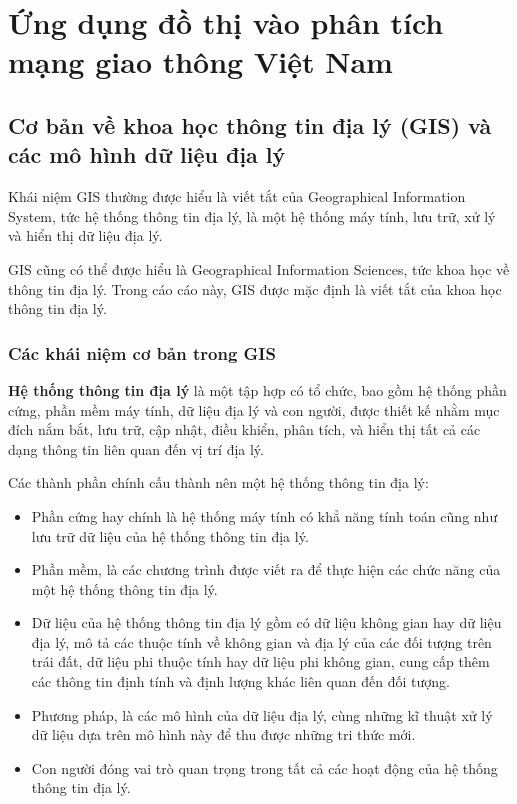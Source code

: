 \documentclass[14pt, oneside, a4paper, openany]{scrartcl}
\begin{document}
\section{Ứng dụng đồ thị vào phân tích mạng giao thông Việt Nam}
\subsection{Cơ bản về khoa học thông tin địa lý (GIS) và các mô hình dữ liệu địa lý}

Khái niệm GIS thường được hiểu là viết tắt của Geographical Information System, tức hệ thống thông tin địa lý, là một hệ thống máy tính, lưu trữ, xử lý và hiển thị dữ liệu địa lý.

GIS cũng có thể được hiểu là Geographical Information Sciences, tức khoa học về thông tin địa lý. Trong cáo cáo này, GIS được mặc định là viết tắt của khoa học thông tin địa lý.

\subsubsection{Các khái niệm cơ bản trong GIS}
\textbf{Hệ thống thông tin địa lý}  là một tập hợp có tổ chức, bao gồm hệ thống phần cứng, phần mềm máy tính, dữ liệu địa lý và con người, được thiết kế nhằm mục đích nắm bắt, lưu trữ, cập nhật, điều khiển, phân tích, và hiển thị tất cả các dạng thông tin liên quan đến vị trí địa lý.

Các thành phần chính cấu thành nên một hệ thống thông tin địa lý:
\begin{itemize}
	\item Phần cứng hay chính là hệ thống máy tính có khẳ năng tính toán cũng như lưu trữ dữ liệu của hệ thống thông tin địa lý.
	\item Phần mềm, là các chương trình được viết ra để thực hiện các chức năng của một hệ thống thông tin địa lý.
	\item Dữ liệu của hệ thống thông tin địa lý gồm có dữ liệu không gian hay dữ liệu địa lý, mô tả các thuộc tính về không gian và địa lý của các đối tượng trên trái đất, dữ liệu phi thuộc tính hay dữ liệu phi không gian, cung cấp thêm các thông tin định tính và định lượng khác liên quan đến đối tượng.
	\item Phương pháp, là các mô hình của dữ liệu địa lý, cùng những kĩ thuật xử lý dữ liệu dựa trên mô hình này để thu được những tri thức mới.
	\item Con người đóng vai trò quan trọng trong tất cả các hoạt động của hệ thống thông tin địa lý.
\end{itemize}
\end{document}
